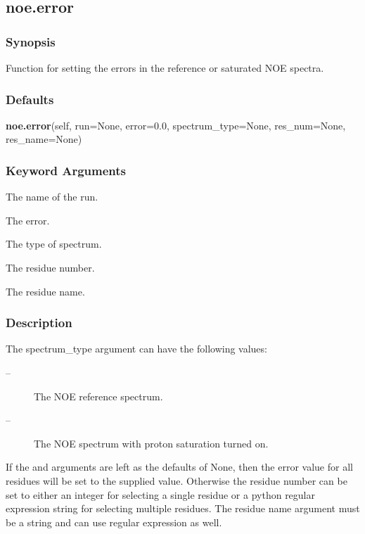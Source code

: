 


\newpage

\subsection{noe.error}


\subsubsection{Synopsis}

Function for setting the errors in the reference or saturated NOE spectra.

\subsubsection{Defaults}

\textsf{\textbf{noe.error}(self, run=None, error=0.0, spectrum\_type=None, res\_num=None, res\_name=None)}


\subsubsection{Keyword Arguments}


  The name of the run.

  The error.

  The type of spectrum.

  The residue number.

  The residue name.

\subsubsection{Description}

The spectrum\_type argument can have the following values:
\begin{description}
\item[    
 --]   The NOE reference spectrum.
\item[    
 --]   The NOE spectrum with proton saturation turned on.
\end{description}

If the 
 and 
 arguments are left as the defaults of None, then the error
value for all residues will be set to the supplied value.  Otherwise the residue number can
be set to either an integer for selecting a single residue or a python  regular expression 
string for selecting multiple residues.  The residue name argument must be a string and can
use regular expression  as well.


